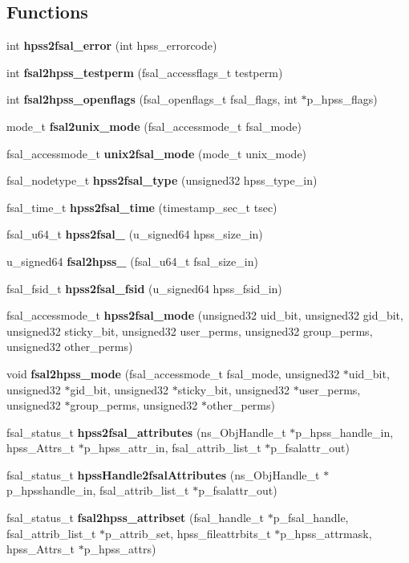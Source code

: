 \subsection*{Functions}
\begin{CompactItemize}
\item 
int {\bf hpss2fsal\_\-error} (int hpss\_\-errorcode)
\item 
int {\bf fsal2hpss\_\-testperm} (fsal\_\-accessflags\_\-t testperm)
\item 
int {\bf fsal2hpss\_\-openflags} (fsal\_\-openflags\_\-t fsal\_\-flags, int $\ast$p\_\-hpss\_\-flags)
\item 
mode\_\-t {\bf fsal2unix\_\-mode} (fsal\_\-accessmode\_\-t fsal\_\-mode)
\item 
fsal\_\-accessmode\_\-t {\bf unix2fsal\_\-mode} (mode\_\-t unix\_\-mode)
\item 
fsal\_\-nodetype\_\-t {\bf hpss2fsal\_\-type} (unsigned32 hpss\_\-type\_\-in)
\item 
fsal\_\-time\_\-t {\bf hpss2fsal\_\-time} (timestamp\_\-sec\_\-t tsec)
\item 
fsal\_\-u64\_\-t {\bf hpss2fsal\_} (u\_\-signed64 hpss\_\-size\_\-in)
\item 
u\_\-signed64 {\bf fsal2hpss\_} (fsal\_\-u64\_\-t fsal\_\-size\_\-in)
\item 
fsal\_\-fsid\_\-t {\bf hpss2fsal\_\-fsid} (u\_\-signed64 hpss\_\-fsid\_\-in)
\item 
fsal\_\-accessmode\_\-t {\bf hpss2fsal\_\-mode} (unsigned32 uid\_\-bit, unsigned32 gid\_\-bit, unsigned32 sticky\_\-bit, unsigned32 user\_\-perms, unsigned32 group\_\-perms, unsigned32 other\_\-perms)
\item 
void {\bf fsal2hpss\_\-mode} (fsal\_\-accessmode\_\-t fsal\_\-mode, unsigned32 $\ast$uid\_\-bit, unsigned32 $\ast$gid\_\-bit, unsigned32 $\ast$sticky\_\-bit, unsigned32 $\ast$user\_\-perms, unsigned32 $\ast$group\_\-perms, unsigned32 $\ast$other\_\-perms)
\item 
fsal\_\-status\_\-t {\bf hpss2fsal\_\-attributes} (ns\_\-Obj\-Handle\_\-t $\ast$p\_\-hpss\_\-handle\_\-in, hpss\_\-Attrs\_\-t $\ast$p\_\-hpss\_\-attr\_\-in, fsal\_\-attrib\_\-list\_\-t $\ast$p\_\-fsalattr\_\-out)
\item 
fsal\_\-status\_\-t {\bf hpss\-Handle2fsal\-Attributes} (ns\_\-Obj\-Handle\_\-t $\ast$p\_\-hpsshandle\_\-in, fsal\_\-attrib\_\-list\_\-t $\ast$p\_\-fsalattr\_\-out)
\item 
fsal\_\-status\_\-t {\bf fsal2hpss\_\-attribset} (fsal\_\-handle\_\-t $\ast$p\_\-fsal\_\-handle, fsal\_\-attrib\_\-list\_\-t $\ast$p\_\-attrib\_\-set, hpss\_\-fileattrbits\_\-t $\ast$p\_\-hpss\_\-attrmask, hpss\_\-Attrs\_\-t $\ast$p\_\-hpss\_\-attrs)
\end{CompactItemize}



